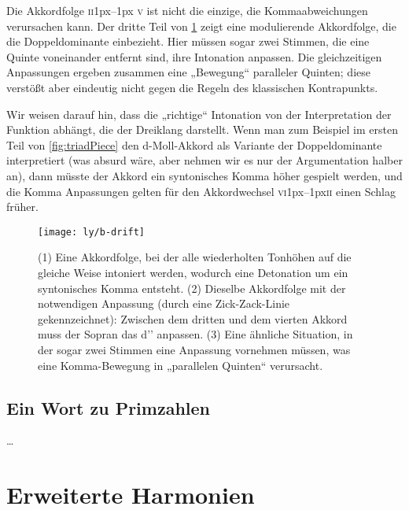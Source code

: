 \documentclass[british,11pt]{scrartcl}
\begin{document}
Die Akkordfolge \textsc{ii}\kern1px–\kern1px \textsc{v} ist nicht die einzige,
die Kommaabweichungen verursachen kann. Der dritte Teil von \cref{fig:drift}
zeigt eine modulierende Akkordfolge, die die Doppeldominante einbezieht. Hier
müssen sogar zwei Stimmen, die eine Quinte voneinander entfernt sind, ihre
Intonation anpassen. Die gleichzeitigen Anpassungen ergeben zusammen eine
„Bewegung“ paralleler Quinten; diese verstößt aber eindeutig nicht gegen die
Regeln des klassischen Kontrapunkts.

Wir weisen darauf hin, dass die „richtige“ Intonation von der Interpretation der
Funktion abhängt, die der Dreiklang darstellt. Wenn man zum Beispiel im ersten
Teil von \cref{fig:triadPiece} den d-Moll-Akkord als Variante der
Doppeldominante interpretiert (was absurd wäre,
aber nehmen wir es nur der Argumentation halber an), dann müsste der Akkord ein
syntonisches Komma höher gespielt werden, und die Komma Anpassungen gelten für
den Akkordwechsel \textsc{vi}\kern1px–\kern1px\textsc{ii} einen Schlag früher.

\begin{figure}
  \centering
  \texttt{[image: ly/b-drift]}
  \caption{(1) Eine Akkordfolge, bei der alle wiederholten Tonhöhen auf die   
  	gleiche Weise intoniert werden, wodurch eine Detonation um ein syntonisches
  	Komma entsteht.%
  	\quad(2) Dieselbe Akkordfolge mit der notwendigen Anpassung (durch eine
  	Zick-Zack-Linie gekennzeichnet): Zwischen dem dritten und dem vierten Akkord
  	muss der Sopran das d’’ anpassen.%
  	\quad(3) Eine ähnliche Situation, in der sogar zwei Stimmen eine Anpassung
  	vornehmen müssen, was eine Komma-Bewegung in „parallelen Quinten“
  	verursacht.}\label{fig:drift}
\end{figure}

\subsection{Ein Wort zu Primzahlen}

…

\section{Erweiterte Harmonien}
\end{document}
